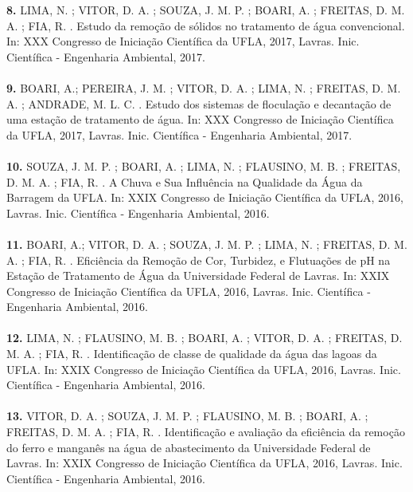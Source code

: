 \documentclass[12pt,a4paper,sans]{moderncv}        %
\begin{document}
	\textbf{8.} LIMA, N. ; VITOR, D. A. ; SOUZA, J. M. P. ; BOARI, A. ; FREITAS, D. M. A. ; FIA, R. . Estudo da remoção de sólidos no tratamento de água convencional. In: XXX Congresso de Iniciação Científica da UFLA, 2017, Lavras. Inic. Científica - Engenharia Ambiental, 2017.
	\\\\
	\textbf{9.} BOARI, A.; PEREIRA, J. M. ; VITOR, D. A. ; LIMA, N. ; FREITAS, D. M. A. ; ANDRADE, M. L. C. . Estudo dos sistemas de floculação e decantação de uma estação de tratamento de água. In: XXX Congresso de Iniciação Científica da UFLA, 2017, Lavras. Inic. Científica - Engenharia Ambiental, 2017.
	\\\\
	\textbf{10.} SOUZA, J. M. P. ; BOARI, A. ; LIMA, N. ; FLAUSINO, M. B. ; FREITAS, D. M. A. ; FIA, R. . A Chuva e Sua Influência na Qualidade da Água da Barragem da UFLA. In: XXIX Congresso de Iniciação Científica da UFLA, 2016, Lavras. Inic. Científica - Engenharia Ambiental, 2016.
	\\\\
	\textbf{11.} 	BOARI, A.; VITOR, D. A. ; SOUZA, J. M. P. ; LIMA, N. ; FREITAS, D. M. A. ; FIA, R. . Eficiência da Remoção de Cor, Turbidez, e Flutuações de pH na Estação de Tratamento de Água da Universidade Federal de Lavras. In: XXIX Congresso de Iniciação Científica da UFLA, 2016, Lavras. Inic. Científica - Engenharia Ambiental, 2016.
	\\\\
	\textbf{12.} LIMA, N. ; FLAUSINO, M. B. ; BOARI, A. ; VITOR, D. A. ; FREITAS, D. M. A. ; FIA, R. . Identificação de classe de qualidade da água das lagoas da UFLA. In: XXIX Congresso de Iniciação Científica da UFLA, 2016, Lavras. Inic. Científica - Engenharia Ambiental, 2016.
	\\\\
	\textbf{13.} VITOR, D. A. ; SOUZA, J. M. P. ; FLAUSINO, M. B. ; BOARI, A. ; FREITAS, D. M. A. ; FIA, R. . Identificação e avaliação da eficiência da remoção do ferro e manganês na água de abastecimento da Universidade Federal de Lavras. In: XXIX Congresso de Iniciação Científica da UFLA, 2016, Lavras. Inic. Científica - Engenharia Ambiental, 2016.
	
	
	
	
	\clearpage
\end{document}
